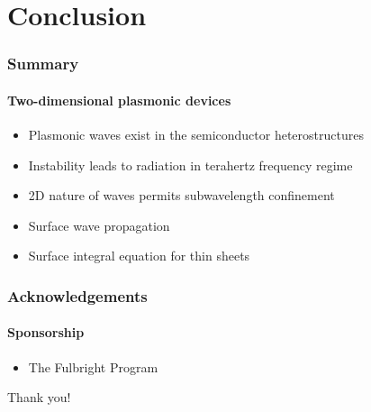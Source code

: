 \documentclass[mathserif,18pt,xcolor=table]{beamer}
\begin{document}
\section{Conclusion}
\begin{frame}
\frametitle{Summary}
\framesubtitle{Two-dimensional plasmonic devices}
    \begin{itemize}
      \item Plasmonic waves exist in the semiconductor heterostructures
      \item Instability leads to radiation in terahertz frequency regime
      \item 2D nature of waves permits subwavelength confinement
      \item Surface wave propagation
      \item Surface integral equation for thin sheets
    \end{itemize}
\end{frame}
\begin{frame}
\frametitle{Acknowledgements}
\framesubtitle{Sponsorship}
    \begin{itemize}
      \item The Fulbright Program
    \end{itemize}
    \begin{figure}
      \centering
      \def\svgwidth{.4\linewidth}
      
    \end{figure}
\end{frame}
\begin{frame}[plain,c]
  \begin{center}
    \Huge Thank you!
  \end{center}
\end{frame}
\end{document}
